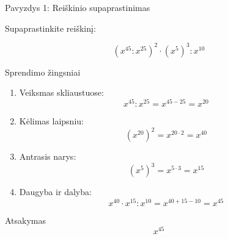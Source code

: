 \documentclass[aspectratio=169,10pt]{beamer}
\begin{document}
\begin{frame}{Pavyzdys 1: Reiškinio supaprastinimas}

    \begin{example}

        Supaprastinkite reiškinį:

        \[
        \left(x^{45}:x^{25}\right)^2
        \cdot
        \left(x^5\right)^3
        :
        x^{10}
        \]

    \end{example}

    \begin{block}{Sprendimo žingsniai}

        \begin{enumerate}

            \item
            Veiksmas skliaustuose:
            \[
            x^{45}:x^{25}
            =
            x^{45-25}
            =
            x^{20}
            \]

            \item
            Kėlimas laipsniu:
            \[
            (x^{20})^2
            =
            x^{20\cdot2}
            =
            x^{40}
            \]

            \item
            Antrasis narys:
            \[
            (x^5)^3
            =
            x^{5\cdot3}
            =
            x^{15}
            \]

            \item
            Daugyba ir dalyba:
            \[
            x^{40}\cdot x^{15}:x^{10}
            =
            x^{40+15-10}
            =
            x^{45}
            \]

        \end{enumerate}

    \end{block}

    \begin{alertblock}{Atsakymas}
        \[
        x^{45}
        \]
    \end{alertblock}

\end{frame}
\end{document}
